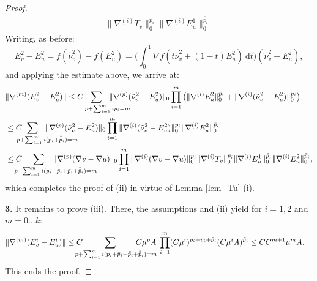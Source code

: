 \documentclass[reqno,twoside,11pt]{amsart}
\newcommand*{\dbar}[1]{\bar{\bar{#1}}}
\newcommand*{\tbar}[1]{\bar{\dbar{#1}}}
\numberwithin{equation}{section}
\theoremstyle{plain}
\theoremstyle{definition}
\begin{document}
\begin{proof}
\begin{equation*}
\begin{split}
\|\nabla^{(i)}T_v\|_0^{\bar p_i} \|\nabla^{(i)}E_u^1\|_0^{\dbar p_i}.
\end{split}
\end{equation*}
Writing, as before:
\begin{equation*}
E^2_v-E^2_u = f(\tilde\nu^2_v) - f(E^2_u) = \Big(\int_0^1\nabla
f(t\tilde\nu^2_v+(1-t)E^2_u)~\mbox{d}t\Big) (\tilde\nu^2_v-E^2_u), 
\end{equation*}
and applying the estimate above, we arrive at:
\begin{equation*}
\begin{split}
&\|\nabla^{(m)}(E^2_v-E^2_u)\|\leq C 
\sum_{p+\sum_{i=1}^mip_i=m\hspace{-10mm}}
\|\nabla^{(p)}(\tilde\nu_v^2-E^2_u)\|_0 \prod_{i=1}^m
\big(\|\nabla^{(i)}E_u^2\|_0^{p_i} + \|\nabla^{(i)}(\tilde\nu_v^2-E^2_u)\|_0^{p_i} \big)
\\ & \leq C \hspace{-3mm}
\sum_{p+\sum_{i=1}^mi(p_i+\tbar p_i)=m\hspace{-13mm}}\hspace{-2mm}
\|\nabla^{(p)}(\tilde\nu_v^2-E^2_u)\|_0 \prod_{i=1}^m
\|\nabla^{(i)}(\tilde\nu_v^2-E^2_u)\|_0^{p_i} \|\nabla^{(i)}E_u^2\|_0^{\tbar p_i} 
\\ & \leq C \hspace{-4mm}
\sum_{p+\sum_{i=1}^mi(p_i+\bar p_i+\dbar p_i+\tbar p_i)=m\hspace{-15mm}}\hspace{-5mm}
\|\nabla^{(p)}(\nabla v-\nabla u)\|_0 \prod_{i=1}^m
\|\nabla^{(i)}(\nabla v-\nabla u)\|_0^{p_i} \|\nabla^{(i)}T_v\|_0^{\bar p_i} 
\|\nabla^{(i)}E_u^1\|_0^{\dbar p_i}\|\nabla^{(i)}E_u^2\|_0^{\tbar p_i},
\end{split}
\end{equation*}
which completes the proof of (ii) in virtue of Lemma \ref{lem_Tu} (i).

\smallskip

{\bf 3.} It remains to prove (iii). There, the assumptions and
(ii) yield for $i=1,2$ and $m=0\ldots k$:
\begin{equation*}
\begin{split}
&\|\nabla^{(m)}(E^i_v- E^i_u)\|\leq C \hspace{-4mm}
\sum_{p+\sum_{i=1}^mi(p_i+\bar p_i+\dbar p_i+\tbar p_i)=m\hspace{-5mm}}\hspace{-5mm}
\bar C\mu^p A \; \prod_{i=1}^m (\bar C\mu^i)^{p_i+\bar p_i +\dbar
  p_i}(\bar C \mu^iA)^{\tbar p_i} \leq C \bar C^{m+1}\mu^m A.
\end{split}
\end{equation*}
This ends the proof.
\end{proof}
\end{document}
